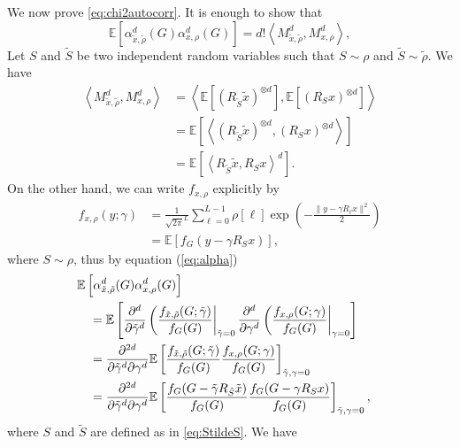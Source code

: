 \documentclass{IEEEtran}
\numberwithin{equation}{section}
\numberwithin{figure}{section}
\theoremstyle{plain}
\theoremstyle{definition}
\theoremstyle{remark}
\theoremstyle{plain}
\theoremstyle{remark}
\theoremstyle{plain}
\theoremstyle{plain}
\theoremstyle{remark}
\newcommand{\E}{\mathbb{E}}
\newcommand{\error}{G}
\begin{document}
We now prove \eqref{eq:chi2autocorr}. It is enough to show that 
$$\E\left[\alpha_{\tilde x,\tilde \rho}^d(\error)\alpha_{x,\rho}^d(\error)\right]=d!\left<M^d_{\tilde x,\tilde \rho},M^d_{x,\rho}\right>,$$
Let $S$ and $\tilde S$ be two independent random variables such that $S\sim \rho$ and $\tilde S\sim \tilde \rho$. We have
\begin{align}
\nonumber \left<M^d_{\tilde x,\tilde \rho},M^d_{x,\rho}\right>
&=\left<\E[(R_{\tilde S} \tilde x)^{\otimes d}],\E[(R_S x)^{\otimes d}]\right>\\
\nonumber &=\E\left[\left<(R_{\tilde S} \tilde x)^{\otimes d},(R_S x)^{\otimes d}\right>\right]\\
&=\E\left[\left<R_{\tilde S} \tilde x,R_S x\right>^d\right]. \label{eq:StildeS}
\end{align}
On the other hand, we can write $f_{x,\rho}$ explicitly by
\begin{align*}
f_{x,\rho}(y;\gamma)
&=\frac1{\sqrt{2\pi}^L}\sum_{\ell=0}^{L-1}
\rho[\ell] \exp\left(-\frac{\|y- \gamma R_\ell x\|^2}{2}\right)\\
&=\E[f_\error(y- \gamma R_S x)],
\end{align*}
where $S\sim \rho$, thus by equation (\ref{eq:alpha})
\begin{align*}
&\hspace{-10pt}\E\left[\alpha_{\tilde x,\tilde \rho}^d(\error)\alpha_{x,\rho}^d(\error)\right]\\
&=\E\left[\frac{\partial^d}{\partial \tilde \gamma^d}\left(\frac{f_{\tilde x,\tilde \rho}(\error;\tilde \gamma)}{f_\error(\error)}\right|_{\tilde \gamma=0}\frac{\partial^d}{\partial \gamma^d}\left(\frac{f_{x,\rho}(\error;\gamma)}{f_\error(\error)}\right|_{\gamma=0}\right]\\
&=\frac{\partial^{2d}}{\partial \tilde \gamma^d\partial \gamma^d}
\E\left[\frac{f_{\tilde x,\tilde \rho}(\error;\tilde \gamma)}{f_\error(\error)}\frac{f_{x,\rho}(\error;\gamma)}{f_\error(\error)}\right]_{\tilde \gamma,\gamma=0}\\
&=\frac{\partial^{2d}}{\partial \tilde \gamma^d\partial \gamma^d}
\E\left[\frac{f_\error(\error- \tilde \gamma R_{\tilde S} \tilde x)}{f_\error(\error)}\frac{f_\error(\error- \gamma R_S x)}{f_\error(\error)}\right]_{\tilde \gamma,\gamma=0},
\end{align*}
where $S$ and $\tilde S$ are defined as in \eqref{eq:StildeS}. We have
\end{document}
